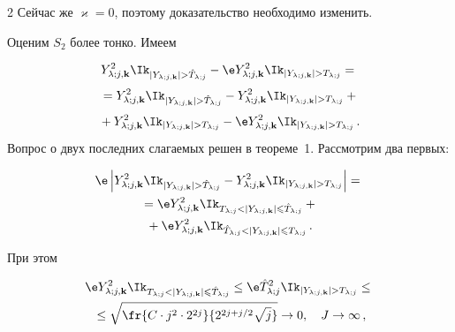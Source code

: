 \begin{multicols}{2}
Сейчас же $\varkappa=0$, поэтому доказательство необходимо изменить.





Оценим $S_2$ более тонко. Имеем


\vspace*{-9pt}





\noindent


\begin{multline*}


\Yljk^2 \indYjkghTj - \e \Yljk^2 \indYjkgTj = {}\\[3pt]


{}= \Yljk^2 \indYjkghTj - \Yljk^2 \indYjkgTj +{}\\[3pt]


{}+ \Yljk^2 \indYjkgTj - \e \Yljk^2 \indYjkgTj\,.


\vspace*{-3pt}


\end{multline*}


\vspace*{-18pt}





\pagebreak





Вопрос о двух последних слагаемых решен в теореме~1. Рассмотрим два первых:


\begin{multline*}


\e \left| \Yljk^2 \indYjkghTj - \Yljk^2 \indYjkgTj \right| = {}\\


{}=\e \Yljk^2 \Ik_{\Tlj<|\Yljk|\leqslant\hTlj} +{}\\


{}+ \e \Yljk^2 \Ik_{\hTlj<|\Yljk|\leqslant\Tlj}\,.


\end{multline*}


При этом


\begin{multline*}


\e \Yljk^2 \Ik_{\Tlj<|\Yljk|\leqslant\hTlj} \leq \e \hTlj^2 \indYjkgTj \leq{}\\


{}\leq \sqrt{\fr{C\cdot j^2\cdot 2^{2j}}{2^{2j+j/2}\sqrt{j}}}\rightarrow 0,\quad J\rightarrow\infty\,,



\end{multline*}
\end{multicols}
